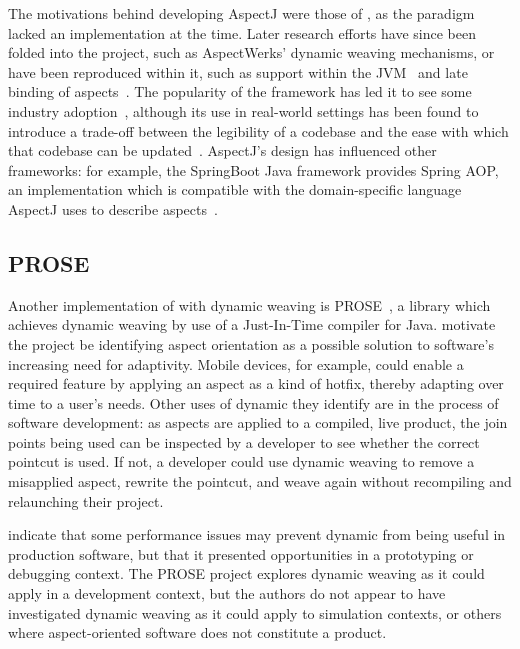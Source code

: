 The motivations behind developing AspectJ were those of \aop{}, as the paradigm
lacked an implementation at the time. Later \aspectorientation{} research
efforts have since been folded into the project, such as AspectWerks' dynamic
weaving mechanisms, or have been reproduced within it, such as support within
the JVM~\cite{golbeck2008lightweight} and late binding of
aspects~\cite{golbeck2010late}. The popularity of the framework has led it to
see some industry adoption~\cite{aspectj_in_industrial_projects}, although its
use in real-world settings has been found to introduce a trade-off between the
legibility of a codebase and the ease with which that codebase can be
updated~\cite{przybylek2018empirical}. AspectJ's design has influenced other
\aspectorientation{} frameworks: for example, the SpringBoot Java framework
provides Spring AOP, an \aop{} implementation which is compatible with the
domain-specific language AspectJ uses to describe
aspects~\cite{introducing_spring_aop_chapter_integration_with_aspectj}.



\subsection{PROSE}

Another implementation of \aop{} with dynamic weaving is
PROSE~\cite{popovici2002PROSE,popovici2003JITaspects}, a library which achieves
dynamic weaving by use of a Just-In-Time compiler for Java.
\citeauthor{popovici2002PROSE} motivate the project be identifying aspect
orientation as a possible solution to software's increasing need for adaptivity.
Mobile devices, for example, could enable a required feature by applying an
aspect as a kind of hotfix, thereby adapting over time to a user's needs. Other
uses of dynamic \aspectorientation{} they identify are in the process of
software development: as aspects are applied to a compiled, live product, the
join points being used can be inspected by a developer to see whether the
correct pointcut is used. If not, a developer could use dynamic weaving to
remove a misapplied aspect, rewrite the pointcut, and weave again without
recompiling and relaunching their project.

\citet{popovici2003JITaspects} indicate that some performance issues may prevent
dynamic \aspectorientation{} from being useful in production software, but that
it presented opportunities in a prototyping or debugging context. The PROSE
project explores dynamic weaving as it could apply in a development context, but
the authors do not appear to have investigated dynamic weaving as it could apply
to simulation contexts, or others where aspect-oriented software does not
constitute a product.

